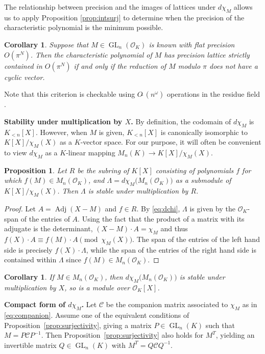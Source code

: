 \documentclass[sigconf]{acmart}
\DeclareMathOperator{\GL}{GL}
\DeclareMathOperator{\adj}{Adj}
\newcommand{\OK}{\mathcal{O}_K}
\newcommand{\softO}{O\tilde{~}}
\newtheorem{prop}[theo]{Proposition}
\newtheorem{cor}[theo]{Corollary}
\theoremstyle{definition}
\begin{document}
The relationship between precision and the images of lattices under $d\chi_M$ allows us to
apply Proposition \ref{prop:intsurj} to determine when the precision of the characteristic polynomial
is the minimum possible.

\begin{cor} \label{cor:prec_gain}
Suppose that $M \in \GL_n(\OK)$ is known with flat precision $O(\pi^N)$.
Then the characteristic polynomial of $M$ has precision lattice strictly contained in $O(\pi^N)$
if and only if the reduction of $M$ modulo $\pi$ does not have a cyclic vector.
\end{cor}

Note that this criterion is checkable using $\softO(n^\omega)$ operations in the residue field \cite{storjohann:01a}.

\medskip

\noindent
{\bf Stability under multiplication by $X$.}
By definition, the codomain of $d \chi_M$ is $K_{< n}[X]$. 
However, when $M$ is given, $K_{< n}[X]$ is canonically isomorphic
to $K[X]/\chi_M(X)$ as a $K$-vector space. For our purpose, it will 
often be convenient to view $d \chi_M$ as a $K$-linear mapping
$M_n(K) \to K[X]/\chi_M(X)$.

\begin{prop}
Let $R$ be the subring of $K[X]$ consisting of polynomials $f$ for
which $f(M) \in M_n(\OK)$, and $\Lambda = d \chi_M \big(M_n(\OK)\big)$
as a submodule of $K[X]/\chi_M(X)$.  Then $\Lambda$ is stable under 
multiplication by $R$.
\end{prop}
\begin{proof}
Let $A = \adj(X{-}M)$ and $f \in R$.  By \eqref{eq:dchi}, $\Lambda$ is given by
the $\OK$-span of the entries of $A$.   Using the fact that the product of a matrix
with its adjugate is the determinant, $(X{-}M) \cdot A = \chi_M$ and thus
$f(X) \cdot A \equiv f(M) \cdot A \pmod{\chi_M(X)}$.  The span of the entries
of the left hand side is precisely $f(X) \cdot \Lambda$, while the span of the entries
of the right hand side is contained within $\Lambda$ since $f(M) \in M_n(\OK)$.
\end{proof}

\begin{cor}
If $M \in M_n(\OK)$, then $d \chi_M \big(M_n(\OK)\big)$ 
is stable under multiplication by $X$, so is a module over $\OK[X]$.
\end{cor}

\medskip

\noindent
{\bf Compact form of $d \chi_M$.}
Let $\mathscr{C}$ be the companion matrix associated to $\chi_M$ as in \eqref{eq:companion}.
Assume one of the equivalent conditions of Proposition~\ref{prop:surjectivity}, giving a matrix 
$P \in \GL_n(K)$ such that $M = P \mathscr{C} P^{-1}$. Then Proposition~\ref{prop:surjectivity}
also holds for $M^T$, yielding an
invertible matrix $Q \in \GL_n(K)$ with $M^T = Q \mathscr{C} Q^{-1}$.
\end{document}
